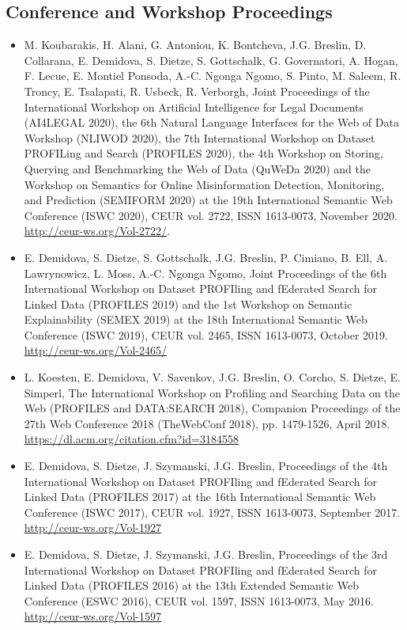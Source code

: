 \documentclass[10pt,a4paper]{res} %
\begin{document}
\begin{resume}
\subsection*{Conference and Workshop Proceedings}

\begin{itemize} \itemsep -2pt
\item M. Koubarakis, H. Alani, G. Antoniou, K. Bontcheva, J.G. Breslin, D. Collarana, E. Demidova, S. Dietze, S. Gottschalk, G. Governatori, A. Hogan, F. Lecue, E. Montiel Ponsoda, A.-C. Ngonga Ngomo, S. Pinto, M. Saleem, R. Troncy, E. Tsalapati, R. Usbeck, R. Verborgh, Joint Proceedings of the International Workshop on Artificial Intelligence for Legal Documents (AI4LEGAL 2020), the 6th Natural Language Interfaces for the Web of Data Workshop (NLIWOD 2020), the 7th International Workshop on Dataset PROFILing and Search (PROFILES 2020), the 4th Workshop on Storing, Querying and Benchmarking the Web of Data (QuWeDa 2020) and the Workshop on Semantics for Online Misinformation Detection, Monitoring, and Prediction (SEMIFORM 2020) at the 19th International Semantic Web Conference (ISWC 2020), CEUR vol. 2722, ISSN 1613-0073, November 2020. \url{http://ceur-ws.org/Vol-2722/}.
\item E. Demidova, S. Dietze, S. Gottschalk, J.G. Breslin, P. Cimiano, B. Ell, A. Lawrynowicz, L. Moss, A.-C. Ngonga Ngomo, Joint Proceedings of the 6th International Workshop on Dataset PROFIling and fEderated Search for Linked Data (PROFILES 2019) and the 1st Workshop on Semantic Explainability (SEMEX 2019) at the 18th International Semantic Web Conference (ISWC 2019), CEUR vol. 2465, ISSN 1613-0073, October 2019. \url{http://ceur-ws.org/Vol-2465/}
\item L. Koesten, E. Demidova, V. Savenkov, J.G. Breslin, O. Corcho, S. Dietze, E. Simperl, The International Workshop on Profiling and Searching Data on the Web (PROFILES and DATA:SEARCH 2018), Companion Proceedings of the 27th Web Conference 2018 (TheWebConf 2018), pp. 1479-1526, April 2018. \url{https://dl.acm.org/citation.cfm?id=3184558}
\item E. Demidova, S. Dietze, J. Szymanski, J.G. Breslin, Proceedings of the 4th International Workshop on Dataset PROFIling and fEderated Search for Linked Data (PROFILES 2017) at the 16th International Semantic Web Conference (ISWC 2017), CEUR vol. 1927, ISSN 1613-0073, September 2017. \url{http://ceur-ws.org/Vol-1927}
\item E. Demidova, S. Dietze, J. Szymanski, J.G. Breslin, Proceedings of the 3rd International Workshop on Dataset PROFIling and fEderated Search for Linked Data (PROFILES 2016) at the 13th Extended Semantic Web Conference (ESWC 2016), CEUR vol. 1597, ISSN 1613-0073, May 2016. \url{http://ceur-ws.org/Vol-1597}

\end{itemize}
\end{resume}
\end{document}
